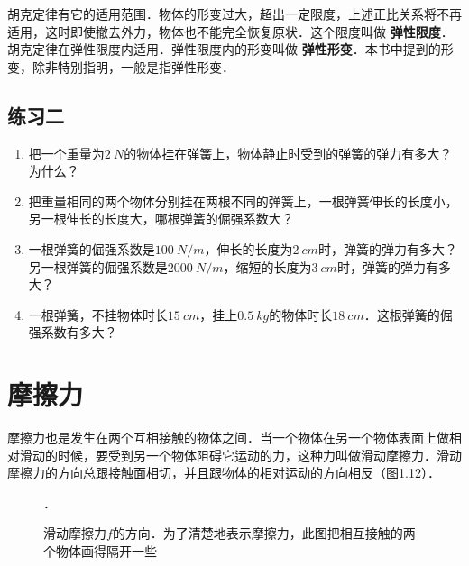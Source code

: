 胡克定律有它的适用范围．物体的形变过大，超出一定限度，上述正比关系将不再适用，这时即使撤去外力，物体也不能完全恢复原状．这个限度叫做\textbf{ 弹性限度}．胡克定律在弹性限度内适用．弹性限度内的形变叫做\textbf{ 弹性形变}．本书中提到的形变，除非特别指明，一般是指弹性形变．

\subsection*{练习二}
\begin{enumerate}
    \item 把一个重量为$\qty{2}{N}$的物体挂在弹簧上，物体静止时受到的弹簧的弹力有多大？为什么？
    \item 把重量相同的两个物体分别挂在两根不同的弹簧上，一根弹簧伸长的长度小，另一根伸长的长度大，哪根弹簧的倔强系数大？
    \item 一根弹簧的倔强系数是$\qty{100}{N/m}$，伸长的长度为$\qty{2}{cm}$时，弹簧的弹力有多大？另一根弹簧的倔强系数是$\qty{2000}{N/m}$，缩短的长度为$\qty{3}{cm}$时，弹簧的弹力有多大？
    \item 一根弹簧，不挂物体时长$\qty{15}{cm}$，挂上$\qty{0.5}{kg}$的物体时长$\qty{18}{cm}$．这根弹簧的倔强系数有多大？
\end{enumerate}

\newpage

\section{摩擦力}

摩擦力也是发生在两个互相接触的物体之间．当一个物体在另一个物体表面上做相对滑动的时候，要受到另一个物体阻碍它运动的力，这种力叫做滑动摩擦力．滑动摩擦力的方向总跟接触面相切，并且跟物体的相对运动的方向相反（图1.12）．
\begin{figure}[H]
    \centering
    \caption{滑动摩擦力$f$的方向．为了清楚地表示摩擦力，此图把相互接触的两个物体画得隔开一些}．
\end{figure}

